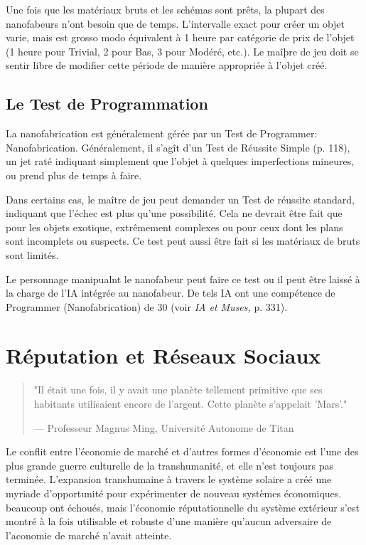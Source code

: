 Une fois que les matériaux bruts et les schémas sont prêts, la plupart des nanofabeurs n'ont besoin que de temps. L'intervalle exact pour créer un objet varie, mais est grosso modo équivalent à 1 heure par catégorie de prix de l'objet (1 heure pour Trivial, 2 pour Bas, 3 pour Modéré, etc.). Le maîþre de jeu doit se sentir libre de modifier cette période de manière appropriée à l'objet créé. 

\subsection{Le Test de Programmation} 

La nanofabrication est généralement gérée par un Test de Programmer: Nanofabrication. Généralement, il s'agît d'un Test de Réussite Simple (p. 118), un jet raté indiquant simplement que l'objet à quelques imperfections mineures, ou prend plus de temps à faire. 

Dans certains cas, le maître de jeu peut demander un Test de réussite standard, indiquant que l'échec est plus qu'une possibilité. Cela ne devrait être fait que pour les objets exotique, extrêmement complexes ou pour ceux dont les plans sont incomplets ou suspects. Ce test peut aussi être fait si les matériaux de bruts sont limités. 

Le personnage manipualnt le nanofabeur peut faire ce test ou il peut être laissé à la charge de l'IA intégrée au nanofabeur. De tels IA ont une compétence de Programmer (Nanofabrication) de 30 (voir \textit{ IA et Muses}\textit{,} p. 331). 

\section{Réputation et Réseaux Sociaux} 

\begin{quote} "Il était une fois, il y avait une planète tellement primitive que ses habitants utilisaient encore de l'argent. Cette planète s'appelait 'Mars'." 

— Professeur Magnus Ming, Université Autonome de Titan \end{quote} 

Le conflit entre l'économie de marché et d'autres formes d'économie est l'une des plus grande guerre culturelle de la transhumanité, et elle n'est toujours pas terminée. L'expansion transhumaine à travers le système solaire a créé une myriade d'opportunité pour expérimenter de nouveau systèmes économiques. beaucoup ont échoués, mais l'économie réputationnelle du système extérieur s'est montré à la fois utilisable et robuste d'une manière qu'aucun adversaire de l'aconomie de marché n'avait atteinte. 

